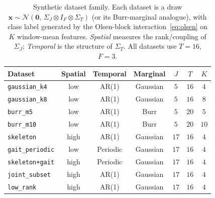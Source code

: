 \begin{table}[t]
\centering\small
\caption{Synthetic dataset family.  Each dataset is a draw $\mathbf{x}\!\sim\!\mathcal{N}(\mathbf{0},\,\Sigma_J\!\otimes\!I_F\!\otimes\!\Sigma_T)$ (or its Burr-marginal analogue), with class label generated by the Olsen-block interaction~\eqref{eq:olsen} on $K$ window-mean features.  \textit{Spatial} measures the rank/coupling of $\Sigma_J$; \textit{Temporal} is the structure of $\Sigma_T$.  All datasets use $T{=}16$, $F{=}3$.}
\label{tab:datasets}
\begin{tabular}{lcccccc}
\toprule
Dataset & Spatial & Temporal & Marginal & $J$ & $T$ & $K$ \\
\midrule
\texttt{gaussian\_k4} & low & AR(1) & Gaussian & $5$ & $16$ & $4$ \\
\texttt{gaussian\_k8} & low & AR(1) & Gaussian & $5$ & $16$ & $8$ \\
\texttt{burr\_m5} & low & AR(1) & Burr & $5$ & $20$ & $5$ \\
\texttt{burr\_m10} & low & AR(1) & Burr & $5$ & $20$ & $10$ \\
\texttt{skeleton} & high & AR(1) & Gaussian & $17$ & $16$ & $4$ \\
\texttt{gait\_periodic} & low & Periodic & Gaussian & $17$ & $16$ & $4$ \\
\texttt{skeleton+gait} & high & Periodic & Gaussian & $17$ & $16$ & $4$ \\
\texttt{joint\_subset} & high & AR(1) & Gaussian & $17$ & $16$ & $4$ \\
\texttt{low\_rank} & high & AR(1) & Gaussian & $17$ & $16$ & $4$ \\
\bottomrule
\end{tabular}
\end{table}
